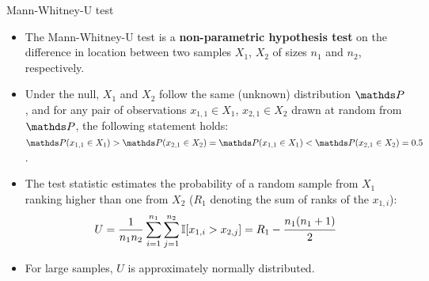 \documentclass[11pt,compress,t,notes=noshow, xcolor=table]{beamer}
\begin{document}

\begin{vbframe}{Mann-Whitney-U test}

\begin{itemize}
  \item The Mann-Whitney-U test is a \textbf{non-parametric hypothesis test} on 
  the difference in location between two samples $X_1$, $X_2$ of sizes $n_1$ and 
  $n_2$, respectively.
  \item Under the null, $X_1$ and $X_2$ follow the same (unknown) distribution 
  $\P$, and for any pair of observations $x_{1,1} \in X_1$, $x_{2,1} \in X_2$ 
  drawn at random from $\P$, the following statement holds:
  $\P(x_{1,1} \in X_1) > \P(x_{2,1} \in X_2) = \P(x_{1,1} \in X_1) < \P(x_{2,1} 
  \in X_2) = 0.5$.
  \item The test statistic estimates the probability of a random sample from 
  $X_1$ ranking higher than one from $X_2$ ($R_1$ denoting the sum of 
  ranks of the $x_{1,i}$):
  \begin{equation*}
      U = \frac{1}{n_1 n_2} \sum_{i = 1}^{n_1} \sum_{j = 1}^{n_2} 
      \mathbb{I}[x_{1,i} > x_{2,j}]
      = R_1 - \cfrac{n_1(n_1 + 1)}{2}
  \end{equation*}
  \item For large samples, $U$ is approximately normally distributed.
\end{itemize}

\end{vbframe}

\end{document}
